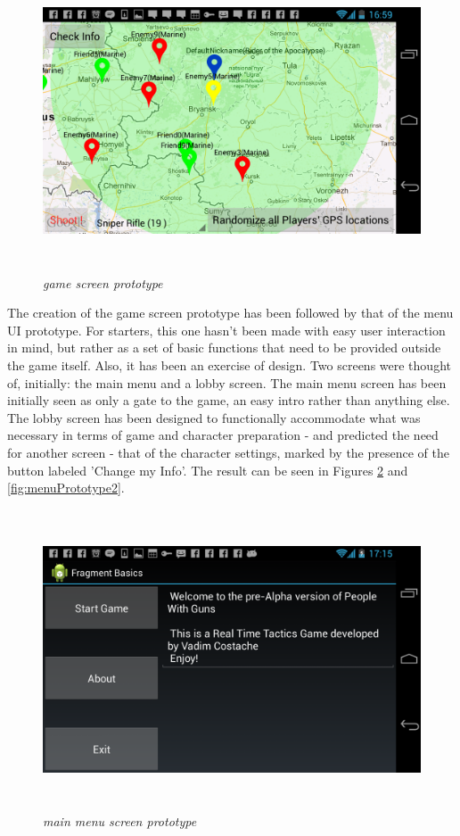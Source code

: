 \begin{figure}
\includegraphics[height=3.5in,width=6.23in]{./images/android_screenshots/ui_prototype/UI_prototype_5.png}  
\caption{\small \sl game screen prototype \label{fig:UIPrototype5}}
\end{figure}


The creation of the game screen prototype has been followed by that of the menu
UI prototype. For starters, this one hasn't been made with easy user interaction
in mind, but rather as a set of basic functions that need to be provided
outside the game itself. Also, it has been an exercise of design. Two screens
were thought of, initially: the main menu and a lobby screen. The main menu
screen has been initially seen as only a gate to the game, an easy intro rather
than anything else. The lobby screen has been designed to functionally
accommodate what was necessary in terms of game and character preparation
- and predicted the need for another screen - that of the character settings,
marked by the presence of the button labeled 'Change my Info'. The result can be
seen in Figures \ref{fig:menuPrototype1} and \ref{fig:menuPrototype2}.

\begin{figure}
\includegraphics[height=3.5in,width=6.23in]{./images/android_screenshots/menu_prototype/MENU_prototype_1.png}  
\caption{\small \sl main menu screen prototype \label{fig:menuPrototype1}}
\end{figure}


